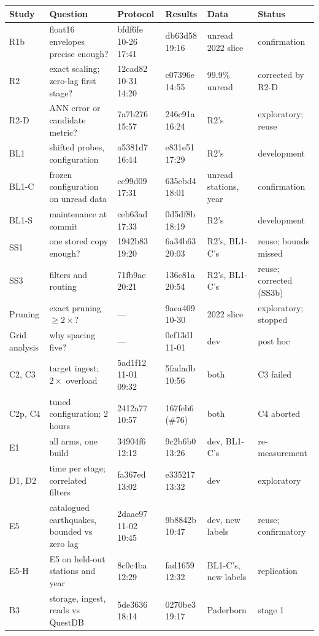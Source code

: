 \documentclass[sigconf,nonacm]{acmart}
\begin{document}
\begin{table}[h]
\small
\begin{tabularx}{\textwidth}{@{}l>{\raggedright\arraybackslash}Xllll@{}}
\toprule
Study & Question & Protocol & Results & Data & Status \\
\midrule
R1b & float16 envelopes precise enough? & bfdf6fe 10-26 17:41 & db63d58 19:16 & unread 2022 slice & confirmation \\
R2 & exact scaling; zero-lag first stage? & 12cad82 10-31 14:20 & c07396e 14:55 & 99.9\% unread & corrected by R2-D \\
R2-D & ANN error or candidate metric? & 7a7b276 15:57 & 246c91a 16:24 & R2's & exploratory; reuse \\
BL1 & shifted probes, configuration & a5381d7 16:44 & e831e51 17:29 & R2's & development \\
BL1-C & frozen configuration on unread data & cc99d09 17:31 & 635ebd4 18:01 & unread stations, year & confirmation \\
BL1-S & maintenance at commit & ceb63ad 17:33 & 0d5df8b 18:19 & R2's & development \\
SS1 & one stored copy enough? & 1942b83 19:20 & 6a34b63 20:03 & R2's, BL1-C's & reuse; bounds missed \\
SS3 & filters and routing & 71fb9ae 20:21 & 136c81a 20:54 & R2's, BL1-C's & reuse; corrected (SS3b) \\
Pruning & exact pruning $\ge 2\times$? & --- & 9aea409 10-30 & 2022 slice & exploratory; stopped \\
Grid analysis & why spacing five? & --- & 0ef13d1 11-01 & dev & post hoc \\
C2, C3 & target ingest; $2\times$ overload & 5ad1f12 11-01 09:32 & 5fadadb 10:56 & both & C3 failed \\
C2p, C4 & tuned configuration; 2 hours & 2412a77 10:57 & 167feb6 (\#76) & both & C4 aborted \\
E1 & all arms, one build & 34904f6 12:12 & 9c2b6b0 13:26 & dev, BL1-C's & re-measurement \\
D1, D2 & time per stage; correlated filters & fa367ed 13:02 & e335217 13:32 & dev & exploratory \\
E5 & catalogued earthquakes, bounded vs zero lag & 2daae97 11-02 10:45 & 9b8842b 10:47 & dev, new labels & reuse; confirmatory \\
E5-H & E5 on held-out stations and year & 8c0c4ba 12:29 & fad1659 12:32 & BL1-C's, new labels & replication \\
B3 & storage, ingest, reads vs QuestDB & 5de3636 18:14 & 0270be3 19:17 & Paderborn & stage 1 \\

\end{tabularx}
\end{table}
\end{document}
